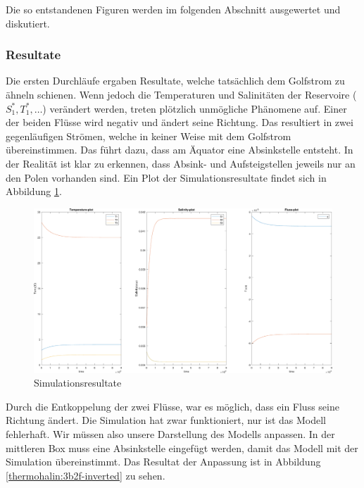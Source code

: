Die so entstandenen Figuren werden im folgenden Abschnitt ausgewertet und diskutiert. 

\subsubsection{Resultate}


Die ersten Durchläufe ergaben Resultate, welche tatsächlich dem Golfstrom zu ähneln schienen. Wenn jedoch die Temperaturen und Salinitäten der Reservoire ( $S_1^*, T_1^*,\dots$) verändert werden, treten plötzlich unmögliche Phänomene auf.
Einer der beiden Flüsse wird negativ und ändert seine Richtung. Das resultiert in zwei gegenläufigen Strömen, welche in keiner Weise mit dem Golfstrom übereinstimmen. Das führt dazu, dass am Äquator eine Absinkstelle entsteht. In der Realität ist klar zu erkennen, dass Absink- und Aufsteigstellen jeweils nur an den Polen vorhanden sind. 
Ein Plot der Simulationsresultate findet sich in Abbildung \ref{thermohalin:simulationsresultate}.

\begin{figure}
	\includegraphics[width=14cm]{thermohalin/Code/graphs/result-3b2f-script.pdf}
	\centering
	\caption{Simulationsresultate}
	\label{thermohalin:simulationsresultate}
\end{figure}

Durch die Entkoppelung der zwei Flüsse, war es möglich, dass ein Fluss seine Richtung ändert.
Die Simulation hat zwar funktioniert, nur ist das Modell fehlerhaft. Wir müssen also unsere Darstellung des Modells anpassen. In der mittleren Box muss eine Absinkstelle eingefügt werden, damit das Modell mit der Simulation übereinstimmt. Das Resultat der Anpassung ist in Abbildung \ref{thermohalin:3b2f-inverted} zu sehen.

